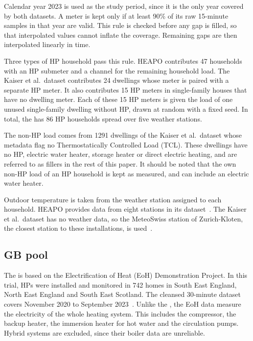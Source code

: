 Calendar year 2023 is used as the study period, since it is the only year covered by both datasets. A meter is kept only if at least 90\% of its raw 15-minute samples in that year are valid. This rule is checked before any gap is filled, so that interpolated values cannot inflate the coverage. Remaining gaps are then interpolated linearly in time.

Three types of HP household pass this rule. HEAPO contributes 47 households with an HP submeter and a channel for the remaining household load. The Kaiser et al.\ dataset contributes 24 dwellings whose meter is paired with a separate HP meter. It also contributes 15 HP meters in single-family houses that have no dwelling meter. Each of these 15 HP meters is given the load of one unused single-family dwelling without HP, drawn at random with a fixed seed. In total, the \poolCH{} has 86 HP households spread over five weather stations.

The non-HP load comes from \num{1291} dwellings of the Kaiser et al.\ dataset whose metadata flag no Thermostatically Controlled Load (TCL). These dwellings have no HP, electric water heater, storage heater or direct electric heating, and are referred to as fillers in the rest of this paper. It should be noted that the own non-HP load of an HP household is kept as measured, and can include an electric water heater.

Outdoor temperature is taken from the weather station assigned to each household. HEAPO provides data from eight stations in its dataset~\cite{brudermueller2025heapo}. The Kaiser et al.\ dataset has no weather data, so the MeteoSwiss station of Zurich-Kloten, the closest station to these installations, is used~\cite{kaiser2026swiss}.

\subsection{GB pool}\label{sec:data-gb}

The \poolGB{} is based on the Electrification of Heat (EoH) Demonstration Project. In this trial, HPs were installed and monitored in 742 homes in South East England, North East England and South East Scotland. The cleansed 30-minute dataset covers November 2020 to September 2023~\cite{esc2024eoh}. Unlike the \poolCH, the EoH data measure the electricity of the whole heating system. This includes the compressor, the backup heater, the immersion heater for hot water and the circulation pumps. Hybrid systems are excluded, since their boiler data are unreliable.

